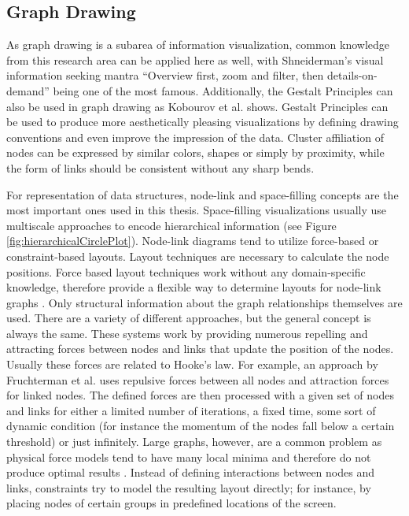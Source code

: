 \subsection{Graph Drawing}

As graph drawing is a subarea of information visualization, common knowledge from this research area can be applied here as well, with Shneiderman's visual information seeking mantra \label{seeking mantra} “Overview first, zoom and filter, then details-on-demand” \cite{shneiderman_eyes_1996} being one of the most famous. Additionally, the Gestalt Principles can also be used in graph drawing as Kobourov et al.
\cite{kobourov_gestalt_2015} shows. Gestalt Principles can be used to produce more aesthetically pleasing visualizations by defining drawing conventions and even improve the impression of the data. Cluster affiliation of nodes can be expressed by similar colors, shapes or simply by proximity, while the form of links should be consistent without any sharp bends.

For representation of data structures, node-link and space-filling concepts are the most important ones used in this thesis. Space-filling visualizations usually use multiscale approaches to encode hierarchical information (see Figure \ref{fig:hierarchicalCirclePlot}). Node-link diagrams tend to utilize force-based or constraint-based layouts\cite{von_landesberger_visual_2011}. Layout techniques are necessary to calculate the node positions. 
Force based\label{exp:force_based_background} layout techniques work without any domain-specific knowledge, therefore provide a flexible way to determine layouts for node-link graphs \cite{kobourov_spring_2012}. Only structural information about the graph relationships themselves are used. 
There are a variety of different approaches, but the general concept is always the same. 
These systems work by providing numerous repelling and attracting forces between nodes and links that update the position of the nodes. Usually these forces are related to Hooke's law. For example, an approach by Fruchterman et al. \cite{fruchterman_graph_1991} uses repulsive forces between all nodes and attraction forces for linked nodes.
The defined forces are then processed with a given set of nodes and links for either a limited number of iterations, a fixed time, some sort of dynamic condition (for instance the momentum of the nodes fall below a certain threshold) or just infinitely.
Large graphs, however, are a common problem as physical force models tend to have many local minima and therefore do not produce optimal results \cite{kobourov_spring_2012}.
Instead of defining interactions between nodes and links, constraints try to model the resulting layout directly; for instance, by placing nodes of certain groups in predefined locations of the screen.

